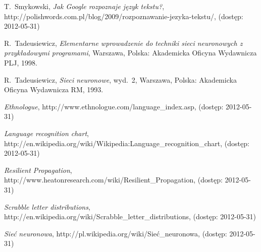\documentclass[journal]{IEEEtran}
\begin{document}

%
%
%
\begin{thebibliography}{1}

T.~Smykowski, \emph{Jak Google rozpoznaje język tekstu?},
http://polishwords.com.pl/blog/2009/rozpoznawanie-jezyka-tekstu/,
(dostęp: 2012-05-31)

R.~Tadeusiewicz, \emph{Elementarne wprowadzenie do techniki sieci neuronowych
z przykładowymi programami}, Warszawa, Polska: Akademicka Oficyna Wydawnicza PLJ, 1998.

R.~Tadeusiewicz, \emph{Sieci neuronowe}, wyd.~2, Warszawa, Polska: Akademicka
Oficyna Wydawnicza RM, 1993.

\emph{Ethnologue}, http://www.ethnologue.com/language\_index.asp,
(dostęp: 2012-05-31)

\emph{Language recognition chart}, \\ http://en.wikipedia.org/wiki/Wikipedia:Language\_recognition\_chart,
(dostęp: 2012-05-31)

\emph{Resilient Propagation}, \\ http://www.heatonresearch.com/wiki/Resilient\_Propagation,
(dostęp: 2012-05-31)

\emph{Scrabble letter distributions}, \\ http://en.wikipedia.org/wiki/Scrabble\_letter\_distributions,
(dostęp: 2012-05-31)

\emph{Sieć neuronowa}, http://pl.wikipedia.org/wiki/Sieć\_neuronowa,
(dostęp: 2012-05-31)


\end{thebibliography}
\end{document}
